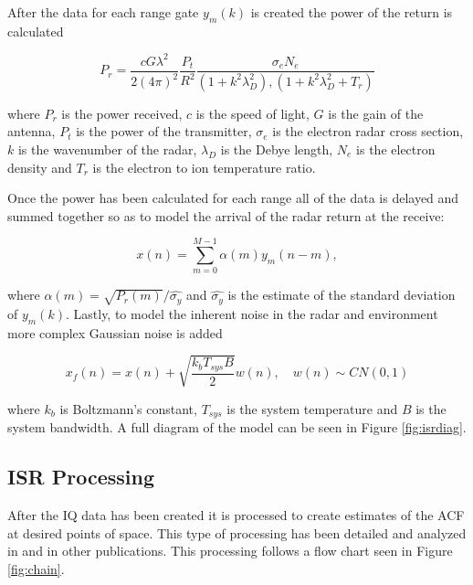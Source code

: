 \documentclass[draft,ras]{agutex}
\begin{document}
\begin{article}
After the data for each range gate $y_m(k)$ is created the power of the return is calculated

\begin{equation}
\label{eq3}
P_r = \frac{cG \lambda^2}{2(4\pi)^2}\frac{P_t }{R^2}\frac{\sigma_e N_e}{(1+k^2\lambda_D^2),(1+k^2\lambda_D^2 + T_r)}
\end{equation}
 
 \noindent where $P_r$ is the power received, $c$ is the speed of light, $G$ is the gain of the antenna, $P_t$ is the power of the transmitter, $\sigma_e$ is the electron radar cross section, $k$ is the wavenumber of the radar, $\lambda_D$ is the Debye length, $N_e$ is the electron density and $T_r$ is the electron to ion temperature ratio.
  
Once the power has been calculated for each range all of the data is delayed and summed together so as to model the arrival of the radar return at the receive: 
 
\begin{equation}
\label{eq4}
x(n) = \displaystyle\sum\limits_{m =0}^{M-1} \alpha(m)y_m(n-m),
\end{equation}

\noindent where $\alpha(m) = \sqrt{P_r(m)}/\hat{\sigma_y}$ and $\hat{\sigma_y}$ is the estimate of the standard deviation of $y_m(k)$. Lastly, to model the inherent noise in the radar and environment more complex Gaussian noise is added

\begin{equation}
\label{eq4}
x_f(n) = x(n) +\sqrt{\frac{k_bT_{sys}B}{2}} w(n), \quad w(n)\sim CN(0,1)
\end{equation}

\noindent where $k_b$ is Boltzmann's constant, $T_{sys}$ is the system temperature and $B$ is the system bandwidth.
A full diagram of the model can be seen in Figure \ref{fig:isrdiag}.

\subsection{ISR Processing}

After the IQ data has been created it is processed to create estimates of the ACF at desired points of space. This type of processing has been detailed and analyzed in \citep{farley1969} and in other publications. This processing follows a flow chart seen in Figure \ref{fig:chain}.


\end{article}
\end{document}
